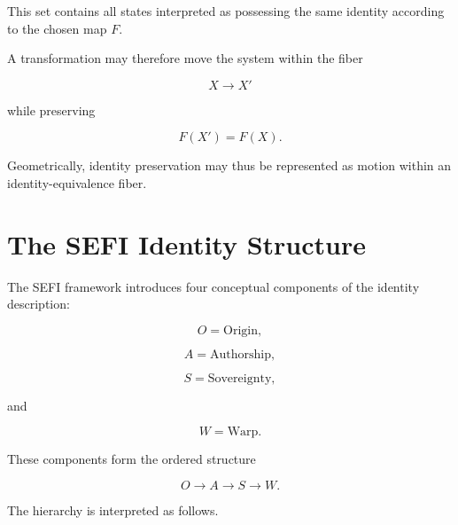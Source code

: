 \documentclass[12pt,oneside]{book}
\begin{document}
This set contains all states interpreted as possessing the same
identity according to the chosen map \(F\).

A transformation may therefore move the system within the fiber

\begin{equation}
    X
    \longrightarrow
    X'
\end{equation}

while preserving

\begin{equation}
    F(X')
    =
    F(X).
\end{equation}

Geometrically, identity preservation may thus be represented as
motion within an identity-equivalence fiber.


\section{The SEFI Identity Structure}
\label{sec:sefi-identity-structure}

The SEFI framework introduces four conceptual components of the
identity description:

\begin{equation}
    O
    =
    \text{Origin},
\end{equation}

\begin{equation}
    A
    =
    \text{Authorship},
\end{equation}

\begin{equation}
    S
    =
    \text{Sovereignty},
\end{equation}

and

\begin{equation}
    W
    =
    \text{Warp}.
\end{equation}

These components form the ordered structure

\begin{equation}
    \boxed{
    O
    \longrightarrow
    A
    \longrightarrow
    S
    \longrightarrow
    W
    }.
    \label{eq:sefi-layer-hierarchy}
\end{equation}

The hierarchy is interpreted as follows.
\end{document}
